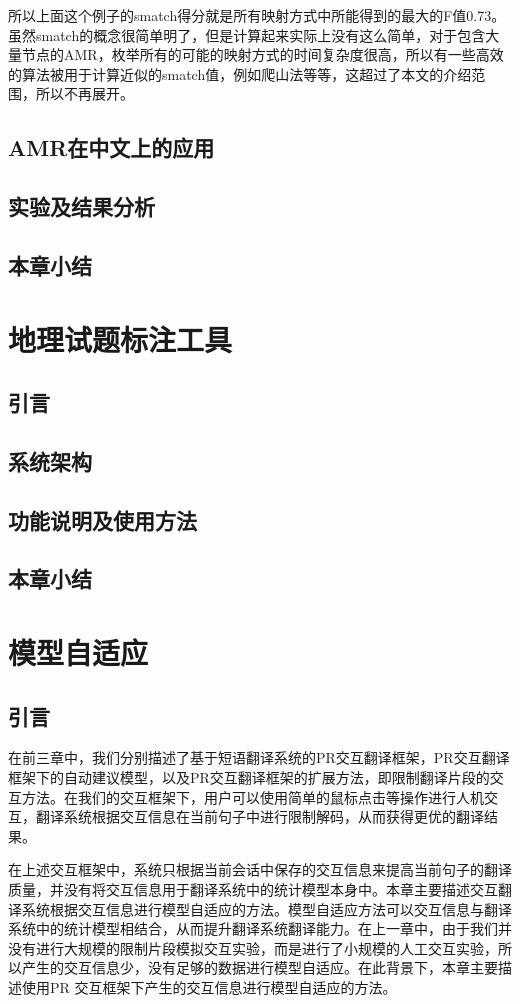 \documentclass[master, winfont]{njuthesis}
\begin{document}
所以上面这个例子的smatch得分就是所有映射方式中所能得到的最大的F值0.73。虽然smatch的概念很简单明了，但是计算起来实际上没有这么简单，对于包含大量节点的AMR，枚举所有的可能的映射方式的时间复杂度很高，所以有一些高效的算法被用于计算近似的smatch值，例如爬山法等等，这超过了本文的介绍范围，所以不再展开。

\section{AMR在中文上的应用}
\section{实验及结果分析}
\section{本章小结}

\chapter{地理试题标注工具}
\section{引言}
\section{系统架构}
\section{功能说明及使用方法}
\section{本章小结}

\chapter{模型自适应}
\section{引言}
在前三章中，我们分别描述了基于短语翻译系统的PR交互翻译框架，PR交互翻译框架下的自动建议模型，以及PR交互翻译框架的扩展方法，即限制翻译片段的交互方法。在我们的交互框架下，用户可以使用简单的鼠标点击等操作进行人机交互，翻译系统根据交互信息在当前句子中进行限制解码，从而获得更优的翻译结果。

在上述交互框架中，系统只根据当前会话中保存的交互信息来提高当前句子的翻译质量，并没有将交互信息用于翻译系统中的统计模型本身中。本章主要描述交互翻译系统根据交互信息进行模型自适应的方法。模型自适应方法可以交互信息与翻译系统中的统计模型相结合，从而提升翻译系统翻译能力。在上一章中，由于我们并没有进行大规模的限制片段模拟交互实验，而是进行了小规模的人工交互实验，所以产生的交互信息少，没有足够的数据进行模型自适应。在此背景下，本章主要描述使用PR 交互框架下产生的交互信息进行模型自适应的方法。
\end{document}
